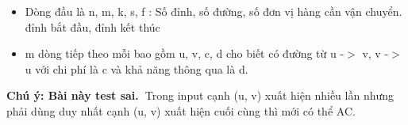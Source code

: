 \begin{itemize}
	\item Dòng đầu là n, m, k, s, f : Số đỉnh, số đường, số đơn vị hàng cần vận chuyển. đỉnh bắt đầu, đỉnh kết thúc
	\item m dòng tiếp theo mỗi bao gồm u, v, c, d cho biết có đường từ u -$>$ v, v -$>$ u với chi phí là c và khả năng thông qua là d.
\end{itemize}

\textbf{Chú ý: Bài này test sai. }Trong input cạnh (u, v) xuất hiện nhiều lần nhưng phải dùng duy nhất cạnh (u, v) xuất hiện cuối cùng thì mới có thể AC.

\